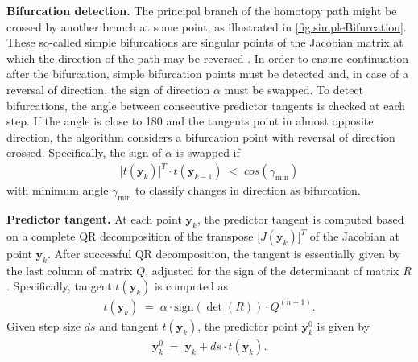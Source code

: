 \documentclass[11pt,fleqn]{article}
\begin{document}
\textbf{Bifurcation detection.} %
The principal branch of the homotopy path might be crossed by another branch at some point, as illustrated in \autoref{fig:simpleBifurcation}. These so-called simple bifurcations are singular points of the Jacobian matrix at which the direction of the path may be reversed \citep[chapter 8]{AllgowerGeorg1990}. In order to ensure continuation after the bifurcation, simple bifurcation points must be detected and, in case of a reversal of direction, the sign of direction $\alpha$ must be swapped. To detect bifurcations, the angle between consecutive predictor tangents is checked at each step. If the angle is close to 180\degree{} and the tangents point in almost opposite direction, the algorithm considers a bifurcation point with reversal of direction crossed. Specifically, the sign of $\alpha$ is swapped if
\begin{align*}
	\bigl[t(\bm{y}_k)\bigr]^T \cdot t(\bm{y}_{k-1}) \;<\; cos(\gamma_{\text{min}})
\end{align*}
with minimum angle $\gamma_{\text{min}}$ to classify changes in direction as bifurcation.



\textbf{Predictor tangent.} %
At each point $\bm{y}_k$, the predictor tangent is computed based on a complete QR decomposition of the transpose $\bigl[ J(\bm{y}_k) \bigr]^T$ of the Jacobian at point $\bm{y}_k$. After successful QR decomposition, the tangent is essentially given by the last column of matrix $Q$, adjusted for the sign of the determinant of matrix $R$. Specifically, tangent $t(\bm{y}_k)$ is computed as
\begin{align*}
	t(\bm{y}_k) \;=\; \alpha \cdot \text{sign}(\det(R)) \cdot Q^{(n+1)}.
\end{align*}
Given step size $ds$ and tangent $t(\bm{y}_k)$, the predictor point $\bm{y}_k^0$ is given by
\begin{align*}
	\bm{y}_k^0 \;=\; \bm{y}_k + ds \cdot t(\bm{y}_k).
\end{align*}
\end{document}
